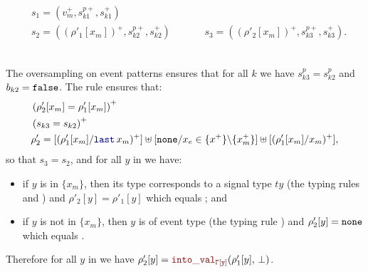 \begin{skippableproof}
{\begin{minipage}{1.2\textwidth}
\begin{equation*}
\begin{array}{llcll}
                               & s_1 = (v_m^+, s^{p+}_{k1}, s_{k1}^+)                                                         \\
                               & s_2 = ((\rho'_1[x_m])^+, s^{p+}_{k2}, s_{k2}^+)                                    & \quad &
                               & s_3 = ((\rho'_2[x_m])^+, s^{p+}_{k3}, s_{k3}^+).
                \end{array}
            \end{equation*}
        \end{minipage}}\\\noindent
    The oversampling  on event
    patterns ensures that for all $k$ we have $s^p_{k3} = s^p_{k2}$ and $b_{k2} = \mathtt{{false}}$.
    The rule  ensures that:
    \begin{align*}
         & \left(\rho'_2[x_m] = \rho'_1[x_m]\right)^+                                                                                               \\
         & \left(s_{k3} = s_{k2}\right)^+                                                                                                           \\
         & \rho'_2 = [(\rho'_1[x_m] / \last{x_m})^+] \ctxconcat [\none / x_e \in \{x^+\} \backslash \{x_m^+\}] \ctxconcat [(\rho'_1[x_m] / x_m)^+],
    \end{align*}
    so that $s_3 = s_2$, and for all $y$ in  we have:
    \begin{itemize}
        \item if $y$ is in $\{x_m\}$, then its type corresponds to a signal type $ty$
              (\cf the typing rules 
              and ) and $\rho'_2[y] = \rho'_1[y]$
              which equals ; and
        \item if $y$ is not in $\{x_m\}$, then $y$ is of event type  (\cf the
              typing rule ) and $\rho'_2[y] = \mathtt{{none}}$
              which equals .
    \end{itemize}
    Therefore for all $y$ in  we have $\rho'_2[y] = \intoVal{\tyCtx[y]}
        {\rho'_1[y]}{\bot}$.

    \setcounter{paragraph}{0}
\end{skippableproof}

